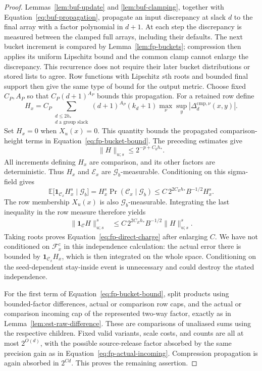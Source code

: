 \begin{proof}
Lemmas~\ref{lem:buf-update} and \ref{lem:buf-clamping}, together with
Equation~\eqref{eq:buf-propagation}, propagate an input discrepancy at
slack $d$ to the final array with a factor polynomial in $d+1$.
At each step the discrepancy is measured between the clamped full
arrays, including their defaults.  The next bucket increment is
compared by Lemma~\ref{lem:fp-buckets}; compression then applies its
uniform Lipschitz bound and the common clamp cannot enlarge the
discrepancy.  This recurrence does not require their later bucket
distributions or stored lists to agree.
Row functions with Lipschitz $s$th roots and bounded final support then give the
same type of bound for the output metric.  Choose fixed $C_P,A_P$ so
that $C_P(d+1)^{A_P}$ bounds this propagation.  For a retained row define
\[
 H_x=C_P\sum_{\substack{d\le2h_*\\d\text{ a group slack}}}
       (d+1)^{A_P}(k_d+1)
       \max_\nu\sup_y|\Delta_d^{\mathrm{cmp},\nu}(x,y)|.
\]
Set $H_x=0$ when $X_u(x)=0$.  This quantity bounds the propagated comparison-height terms in
Equation~\eqref{eq:fp-bucket-bound}.  The preceding estimates give
\[
                 \|H\|_{u;s}\le2^{-p+C_0h_*}.
\]
All increments defining $H_x$ are comparison, and its other factors are
deterministic.  Thus $H_x$ and $\mathcal E_x$ are
$\mathcal G_b$-measurable.  Conditioning on this sigma-field gives
\[
 \mathbb E\bigl[\mathbf1_{\mathcal C_x}H_x^s\mid\mathcal G_b\bigr]
 =H_x^s\Pr(\mathcal C_x\mid\mathcal G_b)
 \le C\,2^{2C_Eh_*}B^{-1/2}H_x^s.
\]
The row membership $X_u(x)$ is also $\mathcal G_b$-measurable.
Integrating the last inequality in the row measure therefore yields
\begin{align*}
 \|\mathbf1_{\mathcal C}H\|_{u;s}^s
 &\le C\,2^{2C_Eh_*}B^{-1/2}
              \|H\|_{u;s}^s.
\end{align*}
Taking roots proves Equation~\eqref{eq:fp-direct-charge} after enlarging
$C$.  We have not conditioned on $\mathcal F_x^c$ in this independence
calculation: the actual error there is bounded by
$\mathbf1_{\mathcal C_x}H_x$, which is then integrated on the whole
space.  Conditioning on the seed-dependent stay-inside event is
unnecessary and could destroy the stated independence.

For the first term of Equation~\eqref{eq:fp-bucket-bound}, split products
using bounded-factor differences, actual or comparison row caps, and the
actual or comparison incoming cap of the represented two-way factor, exactly
as in Lemma~\ref{lem:est-raw-difference}.  These are comparisons of
unaliased sums using the respective children.  Fixed valid
variants, scale costs, and counts are all at most $2^{O(d)}$, with the
possible source-release factor absorbed by the same precision gain as
in Equation~\eqref{eq:fp-actual-incoming}.  Compression propagation is
again absorbed in $2^{C d}$.  This proves the remaining assertion.
\end{proof}

